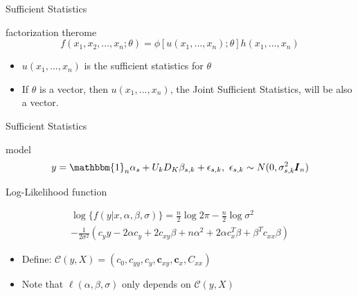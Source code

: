 \documentclass[ignorenonframetext,]{beamer}
\providecommand{\tightlist}{%
  \setlength{\itemsep}{0pt}\setlength{\parskip}{0pt}}
\begin{document}
\begin{frame}{Sufficient Statistics}

\begin{block}{factorization therome}
\[
  f(x_1, x_2, ... , x_n;\theta) =\phi\left[u(x_1, ... , x_n);\theta \right] h(x_1, ... , x_n)
\]

\end{block}

\begin{itemize}
\tightlist
\item
  \(u(x_1, ... , x_n)\) is the sufficient statistics for \(\theta\)
\item
  If \(\theta\) is a vector, then \(u(x_1, ... , x_n)\), the Joint
  Sufficient Statistics, will be also a vector.
\end{itemize}

\end{frame}

\begin{frame}{Sufficient Statistics}

\begin{block}{model}
\[
  y = \mathbbm{1}_{n}\alpha_s + U_kD_K\beta_{s,k} + \epsilon_{s,k},~\epsilon_{s,k} \sim N(0, \sigma^2_{s,k}\pmb{I}_n)
\]
\end{block}

\begin{block}{Log-Likelihood function}

\begin{multline*}
  \log{\{f(y|x, \alpha, \beta, \sigma)\}} =  \frac{n}{2}\log{2\pi} - \frac{n}{2}\log{\sigma^2} \\ -\frac{1}{2\sigma^2}(c_yy - 2\alpha c_y + 2c_{xy}\beta + n\alpha^2 + 2\alpha c_x^T\beta +\beta^T c_{xx} \beta) 
\end{multline*}

\end{block}

\begin{itemize}
\item
  Define:
  \(\mathcal{C}(y, X) = (c_0, c_{yy}, c_y, \pmb{c}_{xy}, \pmb{c}_x, C_{xx})\)
\item
  Note that \(\ell(\alpha, \beta, \sigma)\) only depends on
  \(\mathcal{C}(y, X)\)
\end{itemize}

\end{frame}
\end{document}
